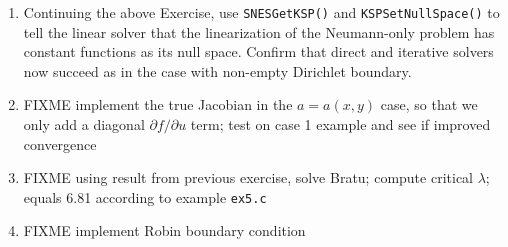 \begin{enumerate}
\item \label{exer:un:allneumannresolution}  Continuing the above Exercise, use \texttt{SNESGetKSP()} and \texttt{KSPSetNullSpace()} to tell the linear solver that the linearization of the Neumann-only problem has constant functions as its null space.  Confirm that direct and iterative solvers now succeed as in the case with non-empty Dirichlet boundary.
\item \label{exer:un:truejacobian} FIXME implement the true Jacobian in the $a=a(x,y)$ case, so that we only add a diagonal $\partial f/\partial u$ term; test on case 1 example and see if improved \pSNES convergence
\item \label{exer:un:bratu} FIXME using result from previous exercise, solve Bratu; compute critical $\lambda$; equals 6.81 according to \pSNES example \texttt{ex5.c}
\item \label{exer:un:robin} FIXME implement Robin boundary condition
\end{enumerate}

